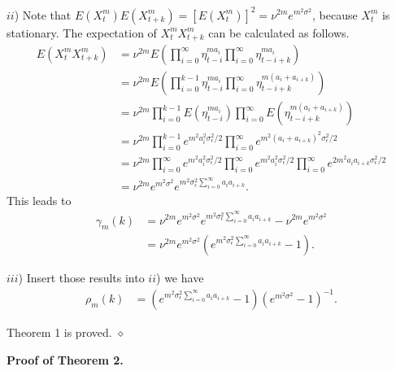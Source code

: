 \documentclass[12pt]{article}
\begin{document}
$ii$) Note that $E(X_{t}^m)E(X_{t+k}^m)=[E(X_{t}^m)]^2=\nu^{2m}e^{m^2\sigma^{2}}$, because $X_{t}^m$ is stationary. The expectation
of $X_{t}^m X_{t+k}^m$ can be calculated as follows.
\begin{align*}
E(X_{t}^mX_{t+k}^m)  &  =\nu^{2m}E\left(\prod\limits_{i=0}^{\infty}%
\eta_{t-i}^{ma_{i}}\prod\limits_{i=0}^{\infty}\eta_{t-i+k}^{ma_{i}}\right) \\
&  =\nu^{2m}E\left(  \prod\limits_{i=0}^{k-1}\eta_{t-i}^{ma_{i}}\prod\limits_{i=0}%
^{\infty}\eta_{t-i+k}^{m(a_{i}+a_{i+k})}\right) \\
&  =\nu^{2m}\prod\limits_{i=0}^{k-1}E\left(  \eta_{t-i}^{ma_{i}}\right)  \prod
\limits_{i=0}^{\infty}E\left(  \eta_{t-i+k}^{m(a_{i}+a_{i+k})}\right) \\
&  =\nu^{2m}\prod\limits_{i=0}^{k-1}e^{m^2a_{i}^{2}\sigma_{\epsilon}^{2}/2}%
\prod\limits_{i=0}^{\infty}e^{m^2(a_{i}+a_{i+k})^{2}\sigma_{\epsilon}^{2}/2}\\
&  =\nu^{2m}\prod\limits_{i=0}^{\infty}e^{m^2a_{i}^{2}\sigma_{\epsilon}^{2}/2}%
\prod\limits_{i=0}^{\infty}e^{m^2a_{i}^{2}\sigma_{\epsilon}^{2}/2}\prod
\limits_{i=0}^{\infty}e^{2m^2a_{i}a_{i+k}\sigma_{\epsilon}^{2}/2}\\
&  =\nu^{2m}e^{m^2\sigma^{2}}e^{m^2 \sigma_{\epsilon}^{2}\sum\limits_{i=0}^{\infty}%
a_{i}a_{i+k}}.
\end{align*}
This leads to
\begin{align}
\gamma_m(k)  &  =\nu^{2m}e^{m^2\sigma^{2}}e^{m^2\sigma_{\epsilon}^{2}%
\sum\limits_{i=0}^{\infty}a_{i}a_{i+k}}-\nu^{2m}e^{m^2\sigma^{2}}\nonumber\label{gammaxs}%
\\
&  =\nu^{2m}e^{m^2\sigma^{2}}\left(  e^{m^2\sigma_{\epsilon}^{2}\sum\limits_{i=0}^{\infty
}a_{i}a_{i+k}}-1\right)  .
\end{align}

$iii$) Insert those results into $ii$) we have
\begin{align}
\rho_m(k)  &  =\left(  e^{m^2\sigma_{\epsilon}^{2}\sum\limits_{i=0}^{\infty
}a_{i}a_{i+k}}-1\right)\left(e^{m^2\sigma^{2}}-1\right)^{-1}.
\end{align}


Theorem 1 is proved. \hfill
$\diamond$



\textbf{Proof of Theorem 2.} 
\end{document}
